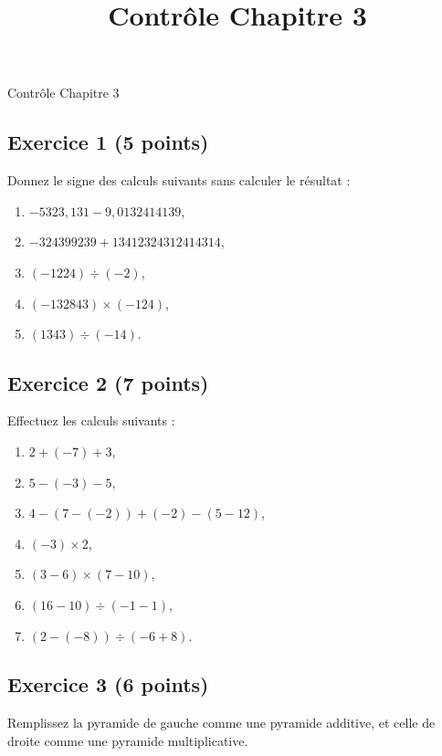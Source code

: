 \documentclass[14 pt]{extarticle}
\title{Contrôle Chapitre 3}
\date{}
\theoremstyle{plain}
\begin{document}
\begin{center}{\large Contrôle Chapitre 3}\\ 
 \end{center}
 
 
 \subsection*{Exercice 1 (5 points)}
 
 Donnez le signe des calculs suivants sans calculer le résultat : 
 \begin{enumerate}
 \item $ -5323,131 - 9,0132414139$, 
 \item $ - 324399239 + 13412324312414314$,
 \item $ (-1224)  \div (-2)$, 
 \item $ (-132843 ) \times (-124)$, 
 \item $(1343) \div (-14).$
 \end{enumerate}

\subsection*{Exercice 2 (7 points)}

Effectuez les calculs suivants : 
\begin{enumerate}
\item $ 2 + (-7) + 3$, 
\item $ 5 - (- 3)  - 5 $, 
\item $ 4 - (7 - (-2) ) + (-2) - (5 -12)$, 
\item $ (-3) \times 2 $, 
\item $ (3 - 6) \times (7- 10)$, 
\item $ (16-10) \div (-1 - 1)$, 
\item $( 2 - ( -8) ) \div ( -6 + 8)$. 
\end{enumerate}

\subsection*{Exercice 3 (6 points)}

Remplissez la pyramide de gauche comme une pyramide additive, et celle de droite comme une pyramide multiplicative. 
\begin{figure}[H]
\center
{}
\ 
\end{figure}
\end{document}
